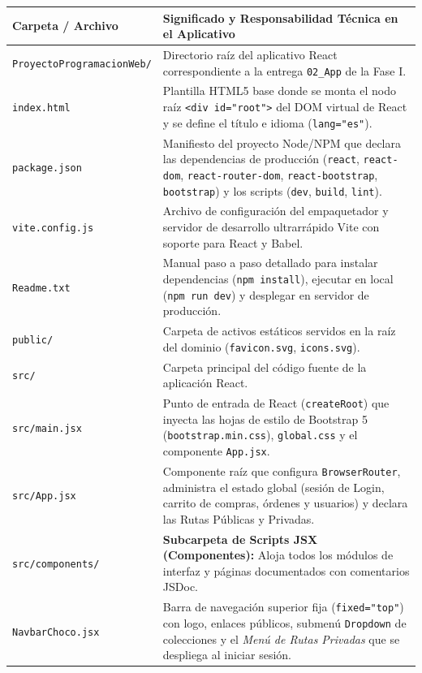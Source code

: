 \documentclass[12pt,letterpaper]{article}
\begin{document}
\begin{longtable}{p{} p{}}
\toprule
\textbf{Carpeta / Archivo} & \textbf{Significado y Responsabilidad Técnica en el Aplicativo} \\
\midrule
\endhead
\texttt{ProyectoProgramacionWeb/} & Directorio raíz del aplicativo React correspondiente a la entrega \texttt{02\_App} de la Fase I. \\
\midrule
\texttt{index.html} & Plantilla HTML5 base donde se monta el nodo raíz \texttt{<div id="root">} del DOM virtual de React y se define el título e idioma (\texttt{lang="es"}). \\
\midrule
\texttt{package.json} & Manifiesto del proyecto Node/NPM que declara las dependencias de producción (\texttt{react}, \texttt{react-dom}, \texttt{react-router-dom}, \texttt{react-bootstrap}, \texttt{bootstrap}) y los scripts (\texttt{dev}, \texttt{build}, \texttt{lint}). \\
\midrule
\texttt{vite.config.js} & Archivo de configuración del empaquetador y servidor de desarrollo ultrarrápido Vite con soporte para React y Babel. \\
\midrule
\texttt{Readme.txt} & Manual paso a paso detallado para instalar dependencias (\texttt{npm install}), ejecutar en local (\texttt{npm run dev}) y desplegar en servidor de producción. \\
\midrule
\texttt{public/} & Carpeta de activos estáticos servidos en la raíz del dominio (\texttt{favicon.svg}, \texttt{icons.svg}). \\
\midrule
\texttt{src/} & Carpeta principal del código fuente de la aplicación React. \\
\midrule
\texttt{src/main.jsx} & Punto de entrada de React (\texttt{createRoot}) que inyecta las hojas de estilo de Bootstrap 5 (\texttt{bootstrap.min.css}), \texttt{global.css} y el componente \texttt{App.jsx}. \\
\midrule
\texttt{src/App.jsx} & Componente raíz que configura \texttt{BrowserRouter}, administra el estado global (sesión de Login, carrito de compras, órdenes y usuarios) y declara las Rutas Públicas y Privadas. \\
\midrule
\texttt{src/components/} & \textbf{Subcarpeta de Scripts JSX (Componentes):} Aloja todos los módulos de interfaz y páginas documentados con comentarios JSDoc. \\
\quad \texttt{NavbarChoco.jsx} & Barra de navegación superior fija (\texttt{fixed="top"}) con logo, enlaces públicos, submenú \texttt{Dropdown} de colecciones y el \textit{Menú de Rutas Privadas} que se despliega al iniciar sesión. \\

\end{longtable}
\end{document}
